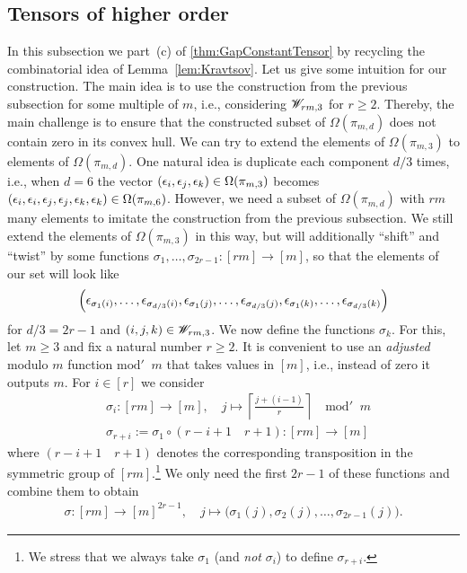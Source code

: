 \subsection{Tensors of higher order} \label{subsec:dTensors}


In this subsection we part~(c) of \ref{thm:GapConstantTensor} by recycling the combinatorial idea of Lemma~\ref{lem:Kravtsov}.
Let us give some intuition for our construction. The main idea is to use the construction from the previous subsection for some multiple of $m$, i.e., considering $\mathscr{W}_{rm,3}$ for $r \geq 2$. Thereby, the main challenge is to ensure that the constructed subset of $\Omega(\pi_{m,d})$ does not contain zero in its convex hull. We can try to extend the elements of $\Omega(\pi_{m,3})$ to elements of $\Omega(\pi_{m,d})$. One natural idea is duplicate each component $d/3$ times, i.e., when $d=6$ the vector $(\epsilon_i, \epsilon_j, \epsilon_k) \in \Omega(\pi_{m,3})$ becomes $(\epsilon_i, \epsilon_i, \epsilon_j, \epsilon_j, \epsilon_k, \epsilon_k) \in \Omega(\pi_{m,6})$. However, we need a subset of $\Omega(\pi_{m,d})$ with $rm$ many elements to imitate the construction from the previous subsection. We still extend the elements of $\Omega(\pi_{m,3})$ in this way, but will additionally ``shift'' and ``twist'' by some functions $\sigma_1, \dots, \sigma_{2r-1} \colon [rm] \to [m]$, so that the elements of our set will look like 
	\[
	\left( \epsilon_{\sigma_1(i)}, \ldots, \epsilon_{\sigma_{d/3}(i)},
	\epsilon_{\sigma_1(j)}, \ldots, \epsilon_{\sigma_{d/3}(j)}, \epsilon_{\sigma_1(k)}, \ldots, \epsilon_{\sigma_{d/3}(k)} \right)
	\]
for $d/3 = 2r-1$ and $(i,j,k) \in \mathscr{W}_{rm,3}$. We now define the functions $\sigma_k$. For this, let $m \geq 3$ and fix a natural number $r \geq 2$. It is convenient to use an \emph{adjusted} modulo $m$ function $\mathrm{mod}' \;\; m$ that takes values in $[m]$, i.e., instead of zero it outputs $m$.
For $i \in [r]$ we consider
\begin{align*}
	&\sigma_{i} \colon [r m] \to [m], \quad j \mapsto \left\lceil \frac{j + (i-1)}{r} \right\rceil \quad \mathrm{mod}' \;\; m \\
	&\sigma_{r + i} := \sigma_1 \circ (r - i + 1 \quad r + 1) \colon [rm] \to [m]
\end{align*}
where $(r - i + 1 \quad r + 1)$ denotes the corresponding transposition in the symmetric group of $[rm]$.\footnote{We stress that we always take $\sigma_1$ (and \emph{not} $\sigma_i$) to define $\sigma_{r+i}$.} We only need the first $2 r - 1$ of these functions and combine them to obtain 
\begin{align*}
	\sigma \colon [r m] \to [m]^{2 r - 1}, \quad j \mapsto \big( \sigma_1(j), \sigma_2(j),\ldots, \sigma_{2 r - 1}(j) \big).
\end{align*}

